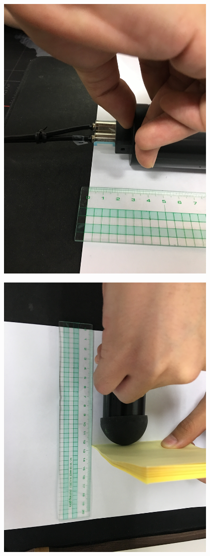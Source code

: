 \documentclass[•]{oblivoir}
\begin{document}
\includegraphics[width=0.8\textwidth]{img01.jpg}

\begin{center}
\includegraphics[width=0.8\textwidth]{img02}
\end{center}
\end{document}
